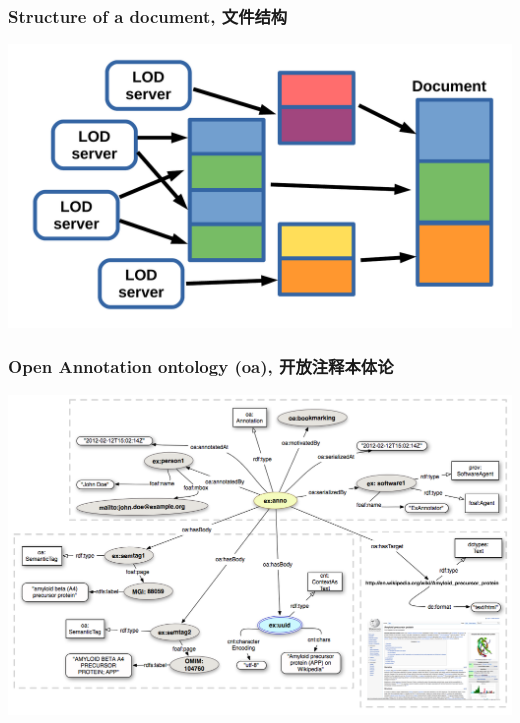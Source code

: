 \documentclass[10pt]{beamer}
\begin{document}
\begin{frame}
  \frametitle{Structure of a document, 文件结构}
  \centering
  \includegraphics[width=1\linewidth]{document-structural-view.pdf}
\end{frame}

\begin{frame}
  \frametitle{Open Annotation ontology (oa), 开放注释本体论}
\begin{adjustwidth}{-3em}{-3em}
  \centering
  \includegraphics[width=1\linewidth]{Open-Annotation_CB_Bookmarking_and_Semantically_Tagging_A_webpage_spec20130128.png}
\end{adjustwidth}

\end{frame}
\end{document}
